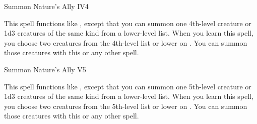 \begin{spellsection}{Summon Nature's Ally IV}{4}
\begin{spellheader}
\end{spellheader}
\begin{spellcontent}
    \spelleffect This spell functions like , except that you can summon one 4th-level creature or 1d3 creatures of the same kind from a lower-level list. When you learn this spell, you choose two creatures from the 4th-level list or lower on . You can summon those creatures with this or any other  spell.
    \spelldur \durshort \dismissable
\end{spellcontent}
\begin{spellfooter}
\end{spellfooter}
\end{spellsection}

\begin{spellsection}{Summon Nature's Ally V}{5}
\begin{spellheader}
\end{spellheader}
\begin{spellcontent}
    \spelleffect This spell functions like , except that you can summon one 5th-level creature or 1d3 creatures of the same kind from a lower-level list. When you learn this spell, you choose two creatures from the 5th-level list or lower on . You can summon those creatures with this or any other  spell.
    \spelldur \durshort \dismissable
\end{spellcontent}
\begin{spellfooter}
\end{spellfooter}
\end{spellsection}

